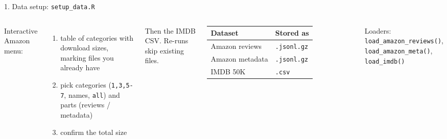 \documentclass[aspectratio=169,10pt]{beamer}
\newcommand{\code}[1]{\texttt{#1}}
\begin{document}
\begin{frame}{1. Data setup: \code{setup\_data.R}}
  \begin{columns}[T]
      Interactive Amazon menu:
      \begin{enumerate}
        \item table of categories with \alert{download sizes}, marking files you \alert{already have}
        \item pick categories (\code{1,3,5-7}, names, \code{all}) and parts (reviews / metadata)
        \item confirm the total size
      \end{enumerate}
      Then the IMDB CSV. Re-runs skip existing files.
      \small
      \begin{tabular}{@{}ll@{}}
        \toprule
        Dataset & Stored as \\
        \midrule
        Amazon reviews & \code{.jsonl.gz} \\
        Amazon metadata & \code{.jsonl.gz} \\
        IMDB 50K & \code{.csv} \\
        \bottomrule
      \end{tabular}
      \vspace{8pt}

      Loaders: \code{load\_amazon\_reviews()}, \code{load\_amazon\_meta()}, \code{load\_imdb()}
  \end{columns}
\end{frame}
\end{document}
